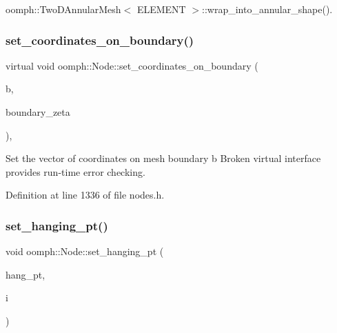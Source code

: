 oomph\+::\+Two\+D\+Annular\+Mesh$<$ E\+L\+E\+M\+E\+N\+T $>$\+::wrap\+\_\+into\+\_\+annular\+\_\+shape().

\mbox{\label{classoomph_1_1Node_a089465d789baa423cd30b3a792ad1e9e}} 
\subsubsection{\texorpdfstring{set\+\_\+coordinates\+\_\+on\+\_\+boundary()}{set\_coordinates\_on\_boundary()}\hspace{0.1cm}{\footnotesize\ttfamily [2/2]}}
{\footnotesize\ttfamily virtual void oomph\+::\+Node\+::set\+\_\+coordinates\+\_\+on\+\_\+boundary (\begin{DoxyParamCaption}\item[{const unsigned \&}]{b,  }\item[{const \hyperlink{classoomph_1_1Vector}{Vector}$<$ double $>$ \&}]{boundary\+\_\+zeta }\end{DoxyParamCaption})\hspace{0.3cm}{\ttfamily [inline]}, {\ttfamily [virtual]}}



Set the vector of coordinates on mesh boundary b Broken virtual interface provides run-\/time error checking. 



Definition at line 1336 of file nodes.\+h.

\mbox{\label{classoomph_1_1Node_a98b3e63390c43196db9429f32319b0ca}} 
\subsubsection{\texorpdfstring{set\+\_\+hanging\+\_\+pt()}{set\_hanging\_pt()}}
{\footnotesize\ttfamily void oomph\+::\+Node\+::set\+\_\+hanging\+\_\+pt (\begin{DoxyParamCaption}\item[{\hyperlink{classoomph_1_1HangInfo}{Hang\+Info} $\ast$const \&}]{hang\+\_\+pt,  }\item[{const int \&}]{i }\end{DoxyParamCaption})}




